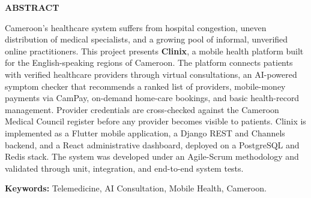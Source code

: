 \begin{center}
{\Large\bfseries ABSTRACT}
\end{center}
\vspace{0.6cm}

Cameroon's healthcare system suffers from hospital congestion, uneven distribution of medical specialists, and a growing pool of informal, unverified online practitioners. This project presents \textbf{Clinix}, a mobile health platform built for the English-speaking regions of Cameroon. The platform connects patients with verified healthcare providers through virtual consultations, an AI-powered symptom checker that recommends a ranked list of providers, mobile-money payments via CamPay, on-demand home-care bookings, and basic health-record management. Provider credentials are cross-checked against the Cameroon Medical Council register before any provider becomes visible to patients. Clinix is implemented as a Flutter mobile application, a Django REST and Channels backend, and a React administrative dashboard, deployed on a PostgreSQL and Redis stack. The system was developed under an Agile-Scrum methodology and validated through unit, integration, and end-to-end system tests.

\vspace{0.6cm}
\noindent\textbf{Keywords:} Telemedicine, AI Consultation, Mobile Health, Cameroon.

\clearpage
